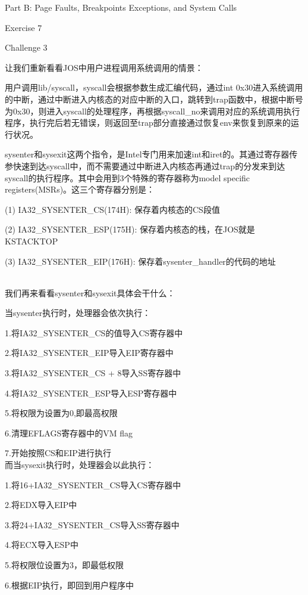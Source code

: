 \documentclass[GBK,winfonts,a4paper,10pt]{ctexart}
\begin{document}
\begin{section}{ Part B: Page Faults, Breakpoints Exceptions, and System Calls }
\begin{subsection}{ Exercise 7 }
\end{subsection}

\begin{subsection}{ Challenge 3 }
\par
让我们重新看看JOS中用户进程调用系统调用的情景：
\par
用户调用lib/syscall，syscall会根据参数生成汇编代码，通过int 0x30进入系统调用的中断，通过中断进入内核态的对应中断的入口，跳转到trap函数中，根据中断号为0x30，则进入syscall的处理程序，再根据syscall\_no来调用对应的系统调用执行程序，执行完后若无错误，则返回至trap部分直接通过恢复env来恢复到原来的运行状况。
\par
sysenter和sysexit这两个指令，是Intel专门用来加速int和iret的。其通过寄存器传参快速到达syscall中，而不需要通过中断进入内核态再通过trap的分发来到达syscall的执行程序。其中会用到3个特殊的寄存器称为model specific registers(MSRs)。这三个寄存器分别是：\par
(1) IA32\_SYSENTER\_CS(174H): 保存着内核态的CS段值		\par
(2) IA32\_SYSENTER\_ESP(175H):	保存着内核态的栈，在JOS就是KSTACKTOP \par
(3) IA32\_SYSENTER\_EIP(176H):	保存着sysenter\_handler的代码的地址 \par  
~\\
我们再来看看sysenter和sysexit具体会干什么： 	\par
当sysenter执行时，处理器会依次执行： 			\par
1.将IA32\_SYSENTER\_CS的值导入CS寄存器中		\par
2.将IA32\_SYSENTER\_EIP导入EIP寄存器中		\par
3.将IA32\_SYSENTER\_CS + 8导入SS寄存器中		\par
4.将IA32\_SYSENTER\_ESP导入ESP寄存器中		\par
5.将权限为设置为0,即最高权限					\par
6.清理EFLAGS寄存器中的VM flag				\par
7.开始按照CS和EIP进行执行					\\
而当sysexit执行时，处理器会以此执行：			\par
1.将16+IA32\_SYSENTER\_CS导入CS寄存器中		\par
2.将EDX导入EIP中							\par
3.将24+IA32\_SYSENTER\_CS导入SS寄存器中		\par
4.将ECX导入ESP中							\par
5.将权限位设置为3，即最低权限				\par
6.根据EIP执行，即回到用户程序中				\par

\end{subsection}
\end{section}
\end{document}
